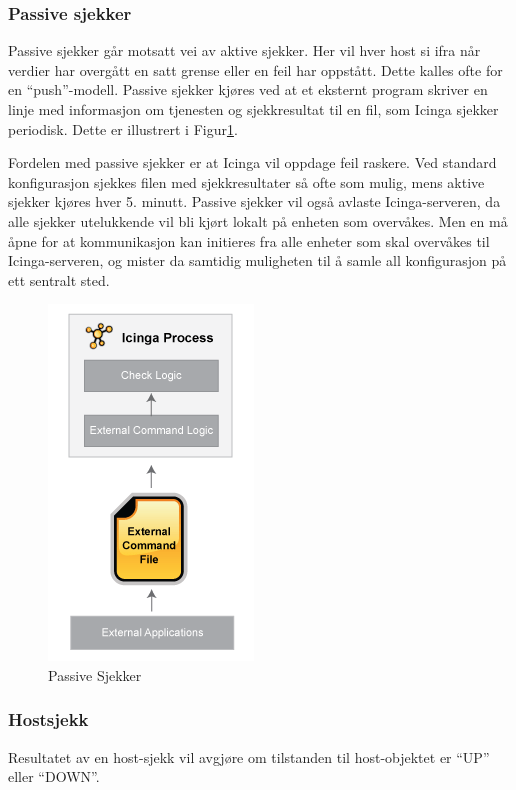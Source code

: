 \subsubsection{Passive sjekker}
Passive sjekker går motsatt vei av aktive sjekker. Her vil hver host si ifra når verdier har overgått en satt grense eller en feil har oppstått. Dette kalles ofte for en ``push''-modell. Passive sjekker kjøres ved at et eksternt program skriver en linje med informasjon om tjenesten og sjekkresultat til en fil, som Icinga sjekker periodisk. Dette er illustrert i Figur\ref{passive_checks}.

Fordelen med passive sjekker er at Icinga vil oppdage feil raskere. Ved standard konfigurasjon sjekkes filen med sjekkresultater så ofte som mulig, mens aktive sjekker kjøres hver 5. minutt. Passive sjekker vil også avlaste Icinga-serveren, da alle sjekker utelukkende vil bli kjørt lokalt på enheten som overvåkes. Men en må åpne for at kommunikasjon kan initieres fra alle enheter som skal overvåkes til Icinga-serveren, og mister da samtidig muligheten til å samle all konfigurasjon på ett sentralt sted. 

\begin{figure}[H]
    \centering
    \includegraphics[scale=0.7]{img/passivechecks.png}
    \caption{Passive Sjekker}
    \label{passive_checks}
\end{figure}

\subsubsection{Hostsjekk}
Resultatet av en host-sjekk vil avgjøre om tilstanden til host-objektet er ``UP'' eller ``DOWN''. 

